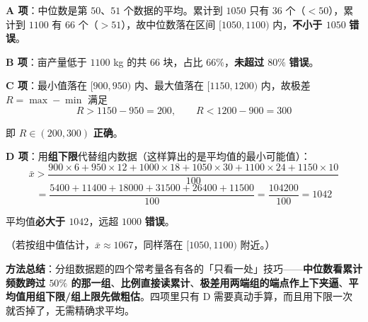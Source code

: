 \begin{answer}
\par\medskip

\textbf{A 项}：中位数是第 $50$、$51$ 个数据的平均。累计到 $1050$ 只有 $36$ 个（$<50$），累计到 $1100$ 有 $66$ 个（$>51$），故中位数落在区间 $[1050,1100)$ 内，\textbf{不小于 $1050$}  \textbf{错误}。

\par\medskip

\textbf{B 项}：亩产量低于 $1100$ kg 的共 $66$ 块，占比 $66\%$，\textbf{未超过 $80\%$}  \textbf{错误}。

\par\medskip

\textbf{C 项}：最小值落在 $[900,950)$ 内、最大值落在 $[1150,1200)$ 内，故极差 $R=\max-\min$ 满足
\nopagebreak[4]
\[R>1150-950=200,\qquad R<1200-900=300\]

即 $R\in(200,300)$  \textbf{正确}。

\par\medskip

\textbf{D 项}：用\textbf{组下限}代替组内数据（这样算出的是平均值的最小可能值）：
\nopagebreak[4]
\[\bar x>\frac{900\times6+950\times12+1000\times18+1050\times30+1100\times24+1150\times10}{100}\]
\nopagebreak[4]
\[=\frac{5400+11400+18000+31500+26400+11500}{100}=\frac{104200}{100}=1042\]

平均值\textbf{必大于 $1042$}，远超 $1000$  \textbf{错误}。

（若按组中值估计，$\bar x\approx1067$，同样落在 $[1050,1100)$ 附近。）

\begin{gktip}
\textbf{方法总结}：分组数据题的四个常考量各有各的「只看一处」技巧——\textbf{中位数看累计频数跨过 $50\%$ 的那一组}、\textbf{比例直接读累计}、\textbf{极差用两端组的端点作上下夹逼}、\textbf{平均值用组下限/组上限先做粗估}。四项里只有 D 需要真动手算，而且用下限一次就否掉了，无需精确求平均。
\end{gktip}


\par\medskip

\end{answer}
